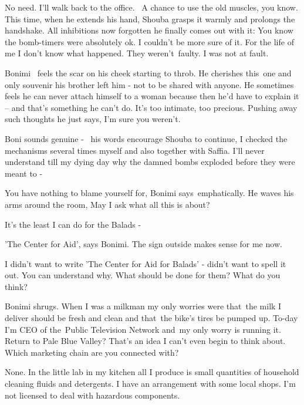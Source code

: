 \documentclass[letterpaper]{article}
\begin{document}
{\textquotedbl}No need. I'll walk back to the office. \ A chance to use the old muscles, you know.{\textquotedbl} This
time, when he extends his hand, Shouba grasps it warmly and prolongs the handshake. All inhibitions now forgotten he
finally comes out with it: {\textquotedbl}You know the bomb-timers were absolutely ok. I couldn't be more sure of it.
For the life of me I don't know what happened. They weren't~faulty. I was not at fault.{\textquotedbl}

Bonimi~ feels the scar on his cheek starting to throb. He cherishes this~one and only souvenir his brother left him -
not to be shared with anyone. He sometimes feels he can never attach himself to a woman because then he'd have to
explain it -- and that's something he can't do. It's too intimate, too precious. Pushing away such thoughts he just
says, {\textquotedbl}I'm sure you weren't.{\textquotedbl}

Boni sounds genuine - \ his words encourage Shouba to continue, {\textquotedbl}I checked the mechanisms several times
myself and also together with Saffia. I'll never understand till my dying day{
}why the damned{ }bombs exploded before they were meant to -{\textquotedbl} 

{\textquotedbl}You have nothing to blame yourself for,{\textquotedbl} Bonimi says~emphatically. He waves his arms around
the room, {\textquotedbl}May I ask what all this is about?{\textquotedbl}

{\textquotedbl}It's the least I can do for the Balads -{\textquotedbl}

{\textquotedbl}'The Center for Aid',{\textquotedbl} says Bonimi. {\textquotedbl}The sign outside makes sense for me
now.{\textquotedbl}

{\textquotedbl}I didn't want to write 'The Center for Aid for Balads' - didn't want to spell it out. You can understand
why. What should be done for them? What do you think?{\textquotedbl}

Bonimi shrugs. {\textquotedbl}When I was a milkman my only worries were that~the milk I deliver should be fresh and
clean and that~the bike's tires be pumped up. To-day I'm CEO of the~Public Television Network and~my only worry is
running it.~ Return to Pale Blue Valley? That's an idea I can't even begin to think about. Which marketing chain are
you connected with?{\textquotedbl}

{\textquotedbl}None. In the little lab in my kitchen all I produce is small quantities of household cleaning fluids and
detergents. I have an arrangement with some local shops. I'm not licensed to deal with hazardous
components.{\textquotedbl} 
\end{document}
